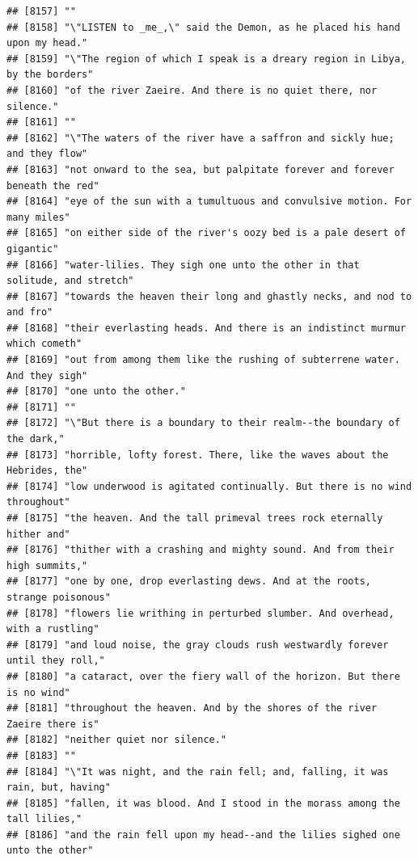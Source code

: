 \documentclass{article}\usepackage[]{graphicx}\usepackage[]{color}
\makeatletter
\newenvironment{kframe}{%
 \def\at@end@of@kframe{}%
 \ifinner\ifhmode%
  \def\at@end@of@kframe{\end{minipage}}%
  \begin{minipage}{\columnwidth}%
 \fi\fi%
 \def\FrameCommand##1{\hskip\@totalleftmargin \hskip-\fboxsep
 \colorbox{shadecolor}{##1}\hskip-\fboxsep
     \hskip-\linewidth \hskip-\@totalleftmargin \hskip\columnwidth}%
 \MakeFramed {\advance\hsize-\width
   \@totalleftmargin\z@ \linewidth\hsize
   \@setminipage}}%
 {\par\unskip\endMakeFramed%
 \at@end@of@kframe}
\newenvironment{knitrout}{}{} %
\makeatother
\begin{document}
\begin{knitrout}
\begin{kframe}
\begin{verbatim}
## [8157] ""                                                                            
## [8158] "\"LISTEN to _me_,\" said the Demon, as he placed his hand upon my head."     
## [8159] "\"The region of which I speak is a dreary region in Libya, by the borders"   
## [8160] "of the river Zaeire. And there is no quiet there, nor silence."              
## [8161] ""                                                                            
## [8162] "\"The waters of the river have a saffron and sickly hue; and they flow"      
## [8163] "not onward to the sea, but palpitate forever and forever beneath the red"    
## [8164] "eye of the sun with a tumultuous and convulsive motion. For many miles"      
## [8165] "on either side of the river's oozy bed is a pale desert of gigantic"         
## [8166] "water-lilies. They sigh one unto the other in that solitude, and stretch"    
## [8167] "towards the heaven their long and ghastly necks, and nod to and fro"         
## [8168] "their everlasting heads. And there is an indistinct murmur which cometh"     
## [8169] "out from among them like the rushing of subterrene water. And they sigh"     
## [8170] "one unto the other."                                                         
## [8171] ""                                                                            
## [8172] "\"But there is a boundary to their realm--the boundary of the dark,"         
## [8173] "horrible, lofty forest. There, like the waves about the Hebrides, the"       
## [8174] "low underwood is agitated continually. But there is no wind throughout"      
## [8175] "the heaven. And the tall primeval trees rock eternally hither and"           
## [8176] "thither with a crashing and mighty sound. And from their high summits,"      
## [8177] "one by one, drop everlasting dews. And at the roots, strange poisonous"      
## [8178] "flowers lie writhing in perturbed slumber. And overhead, with a rustling"    
## [8179] "and loud noise, the gray clouds rush westwardly forever until they roll,"    
## [8180] "a cataract, over the fiery wall of the horizon. But there is no wind"        
## [8181] "throughout the heaven. And by the shores of the river Zaeire there is"       
## [8182] "neither quiet nor silence."                                                  
## [8183] ""                                                                            
## [8184] "\"It was night, and the rain fell; and, falling, it was rain, but, having"   
## [8185] "fallen, it was blood. And I stood in the morass among the tall lilies,"      
## [8186] "and the rain fell upon my head--and the lilies sighed one unto the other"    

\end{verbatim}
\end{kframe}
\end{knitrout}
\end{document}
